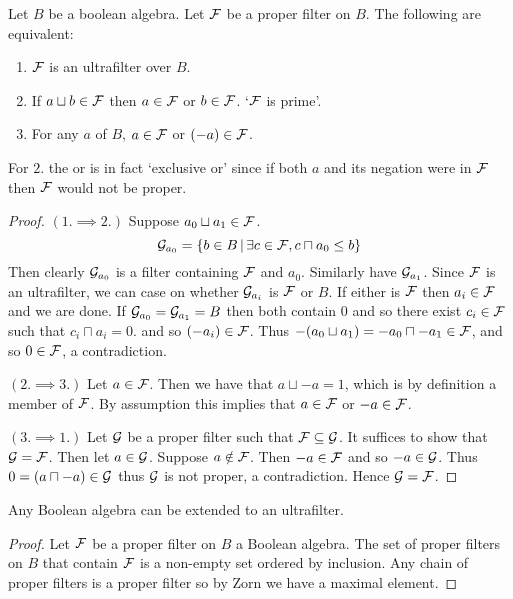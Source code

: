 \begin{prop}
    Let $B$ be a boolean algebra. 
    Let $\mathcal{F}$ be a proper filter on $B$.
    The following are equivalent:
    \begin{enumerate}
        \item $\mathcal{F}$ is an ultrafilter over $B$.
        \item If $a \sqcup b \in \mathcal{F}$ then $a \in \mathcal{F}$ or $b \in \mathcal{F}$.
            `$\mathcal{F}$ is prime'.
        \item For any $a$ of $B$, 
            $a \in \mathcal{F}$ or $(- a) \in \mathcal{F}$.
    \end{enumerate}
    For $2.$ the or is in fact `exclusive or' since if both $a$ 
    and its negation were in $\mathcal{F}$ then $\mathcal{F}$ would not be proper.
\end{prop}
\begin{proof}
    $(1. \implies 2.)$
        Suppose $a_0 \sqcup a_1 \in \mathcal{F}$.
        \[\mathcal{G}_{a_0} = \left\{b \in B \,|\, \exists c \in \mathcal{F}, c \sqcap a_0 \leq b\right\}\]
        Then clearly $\mathcal{G}_{a_0}$ is a filter containing $\mathcal{F}$ and $a_0$.
        Similarly have $\mathcal{G}_{a_1}$.
        Since $\mathcal{F}$ is an ultrafilter, 
        we can case on whether $\mathcal{G}_{a_i}$ is $\mathcal{F}$ or $B$.
        If either is $\mathcal{F}$ then $a_i \in \mathcal{F}$ and we are done.
        If $\mathcal{G}_{a_0} = \mathcal{G}_{a_1} = B$ then both contain $0$ and so 
        there exist $c_i \in \mathcal{F}$ such that 
        $c_i \sqcap a_i = 0$.
        and so $(- a_i) \in \mathcal{F}$.
        Thus $- (a_0 \sqcup a_1) = - a_0 \sqcap - a_1 \in \mathcal{F}$,
        and so $0 \in \mathcal{F}$,
        a contradiction.

    $(2. \implies 3.)$ 
        Let $a \in \mathcal{F}$.
        Then we have that $a \sqcup - a = 1$, 
        which is by definition a member of $\mathcal{F}$.
        By assumption this implies that $a \in \mathcal{F}$ or $- a \in \mathcal{F}$.
    
    $(3. \implies 1.)$
        Let $\mathcal{G}$ be a proper filter such that $\mathcal{F} \subseteq \mathcal{G}$.
        It suffices to show that $\mathcal{G} = \mathcal{F}$.
        Then let $a \in \mathcal{G}$.
        Suppose $a \notin \mathcal{F}$.
        Then $- a \in \mathcal{F}$ and so $- a \in \mathcal{G}$.
        Thus $0 = (a \sqcap - a) \in \mathcal{G}$ 
        thus $\mathcal{G}$ is not proper, a contradiction.
        Hence $\mathcal{G} = \mathcal{F}$.
\end{proof}

\begin{prop}
    Any Boolean algebra 
    can be extended to an ultrafilter.
\end{prop}
\begin{proof}
    Let $\mathcal{F}$ be a proper filter on $B$ a Boolean algebra. 
    The set of proper filters on $B$ that contain $\mathcal{F}$ is a non-empty set 
    ordered by inclusion.
    Any chain of proper filters is a proper filter 
    so by Zorn we have a 
    maximal element.
\end{proof}

